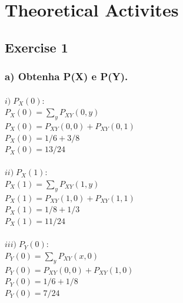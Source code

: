 \documentclass[a4paper]{article}
\begin{document}
\section{Theoretical Activites}

\subsection{Exercise 1}

\subsubsection{a) Obtenha P(X) e P(Y).}

\paragraph{$i) \; P_X(0):                       $
\\
$ \displaystyle P_X(0) = \sum_{y} P_{XY}(0,y)   $\\
$ P_X(0) = P_{XY}(0,0) + P_{XY}(0,1)            $\\
$ P_X(0) = 1/6 + 3/8                            $\\
$ \boxed{ P_X(0) = 13/24 }                      $\\
}
\paragraph{$ii) \; P_X(1):                      $
\\
$ \displaystyle P_X(1) = \sum_{y} P_{XY}(1,y)   $\\
$ P_X(1) = P_{XY}(1,0) + P_{XY}(1,1)            $\\
$ P_X(1) = 1/8 + 1/3                            $\\
$ \boxed{ P_X(1) = 11/24 }                      $\\
}
\paragraph{$iii) \; P_Y(0):                     $
\\
$ \displaystyle P_Y(0) = \sum_{y} P_{XY}(x,0)   $\\
$ P_Y(0) = P_{XY}(0,0) + P_{XY}(1,0)            $\\
$ P_Y(0) = 1/6 + 1/8                            $\\
$ \boxed{ P_Y(0) = 7/24 }                       $\\
}
\end{document}
